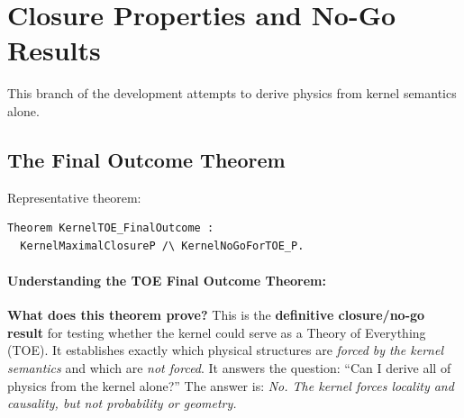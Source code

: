 \section{Closure Properties and No-Go Results}


This branch of the development attempts to derive physics from kernel semantics alone.

\subsection{The Final Outcome Theorem}

Representative theorem:
\begin{lstlisting}
Theorem KernelTOE_FinalOutcome :
  KernelMaximalClosureP /\ KernelNoGoForTOE_P.
\end{lstlisting}

\paragraph{Understanding the TOE Final Outcome Theorem:}

\textbf{What does this theorem prove?} This is the \textbf{definitive closure/no-go result} for testing whether the kernel could serve as a Theory of Everything (TOE). It establishes exactly which physical structures are \textit{forced by the kernel semantics} and which are \textit{not forced}. It answers the question: ``Can I derive all of physics from the kernel alone?'' The answer is: \textit{No. The kernel forces locality and causality, but not probability or geometry.}

